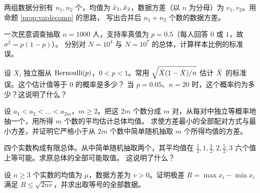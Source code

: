 \begin{exercise}
两组数据分别有 $n_1,n_2$ 个，均值为 $\bar{x}_1,\bar{x}_2$，数据方差（以 $n$ 为分母）为 $v_1,v_2$。用命题 \ref{prop:vardecomp} 的思路，
写出合并后 $n_1+n_2$ 个数的数据方差。
\end{exercise}

\begin{exercise}
一次民意调查抽取 $n=1000$ 人，支持率真值为 $p=0.5$（每人回答 $0$ 或 $1$，故 $\sigma^2=p(1-p)$）。
分别对 $N=10^4$ 与 $N=10^7$ 的总体，计算样本比例的标准误。
\end{exercise}

\begin{exercise}
设 $X_i$ 独立服从 $\operatorname{Bernoulli}(p)$，$0<p<1$。常用 $\sqrt{\bar{X}(1-\bar{X})/n}$ 估计 $\bar{X}$ 的标准误。这个估计值等于 $0$ 的概率是多少？
当 $p=0.05$、$n=20$ 时，这个概率约为多少？这说明了什么？
\end{exercise}

\levelC
\begin{exercise}[原讲义习题 1.1]
设 $a_1<a_2<\dots<a_{2m}$，$m\ge2$。把这 $2m$ 个数分成 $m$ 对，从每对中独立等概率地抽一个，用所得 $m$ 个数的平均估计总体均值。
求使方差最小的全部配对方式与最小方差，并证明它严格小于从 $2m$ 个数中简单随机抽取 $m$ 个所得均值的方差。
\end{exercise}

\begin{exercise}[原讲义例 1.3]
四个实数构成有限总体。从中简单随机抽取两个，其平均值在 $\frac12,1,\frac32,2,\frac52,3$ 六个值上等可能。求原总体的全部可能取值。
这说明了什么？
\end{exercise}

\begin{exercise}
设 $n\ge3$ 个实数的均值为 $\mu$，数据方差为 $v>0$。证明极差 $R=\max x_i-\min x_i$ 满足 $R\le\sqrt{2nv}$，并求出取等号的全部数据。
\end{exercise}
